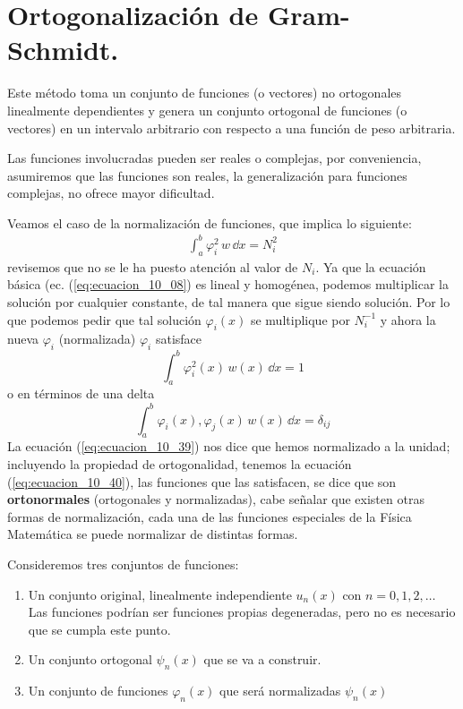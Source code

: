 \section{Ortogonalización de Gram-Schmidt.}
Este método toma un conjunto de funciones (o vectores) no ortogonales linealmente dependientes y genera un conjunto ortogonal de funciones (o vectores) en un intervalo arbitrario con respecto a una función de peso arbitraria.
\par
Las funciones involucradas pueden ser reales o complejas, por conveniencia, asumiremos que las funciones son reales, la generalización para funciones complejas, no ofrece mayor dificultad.
\par
Veamos el caso de la normalización de funciones, que implica lo siguiente:
\begin{align*}
\int_{a}^{b} \varphi_{i}^{2} \, w \, \dd{x}  =  N_{i}^{2}
\end{align*}
revisemos que no se le ha puesto atención al valor de $N_{i}$. Ya que la ecuación básica (ec. (\ref{eq:ecuacion_10_08}) es lineal y homogénea, podemos multiplicar la solución por cualquier constante, de tal manera que sigue siendo solución. Por lo que podemos pedir que tal solución $\varphi_{i}(x)$ se multiplique por $N_{i}^{-1}$ y ahora la nueva $\varphi_{i}$ (normalizada) $\varphi_{i}$ satisface
\begin{equation}
\int_{a}^{b} \varphi_{i}^{2} (x) \, w(x) \, \dd{x} = 1
\label{eq:ecuacion_10_39}
\end{equation}
o en términos de una delta
\begin{equation}
\int_{a}^{b} \varphi_{i}(x) , \varphi_{j} (x) \, w(x) \, \dd{x} = \delta_{ij}
\label{eq:ecuacion_10_40}
\end{equation}
La ecuación (\ref{eq:ecuacion_10_39}) nos dice que hemos normalizado a la unidad; incluyendo la propiedad de ortogonalidad, tenemos la ecuación (\ref{eq:ecuacion_10_40}), las funciones que las satisfacen, se dice que son \textbf{ortonormales} (ortogonales y normalizadas), cabe señalar que existen otras formas de normalización, cada una de las funciones especiales de la Física Matemática se puede normalizar de distintas formas.
\par
Consideremos tres conjuntos de funciones:
\begin{enumerate}
\item Un conjunto original, linealmente independiente $u_{n}(x)$ con $n=0,1,2,\ldots$ \\
Las funciones podrían ser funciones propias degeneradas, pero no es necesario que se cumpla este punto.
\item Un conjunto ortogonal $\psi_{n}(x)$ que se va a construir.
\item Un conjunto de funciones $\varphi_{n}(x)$ que será normalizadas $\psi_{n}(x)$
\end{enumerate}
